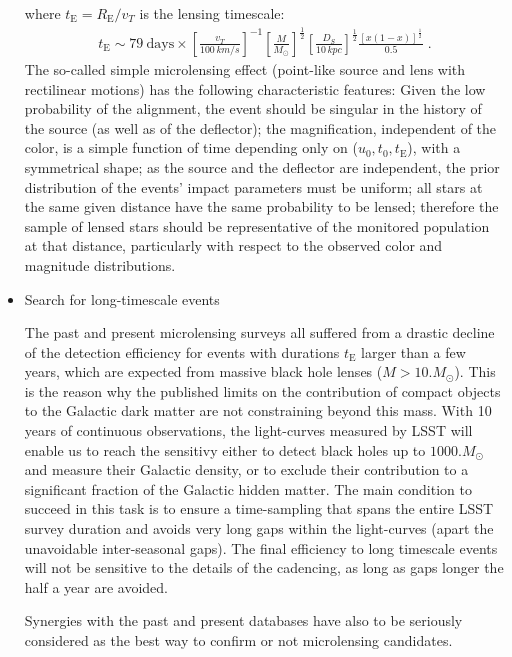 \begin{itemize}
where $t_{\mathrm{E}}=R_{\mathrm{E}} /v_T$ is the lensing timescale:
\begin{eqnarray}
t_{\mathrm{E}} \sim
79\ \mathrm{days} \times %
\left[\frac{v_T}{100\, km/s}\right]^{-1}
\left[\frac{M}{M_\odot}\right]^{\frac{1}{2}}
\left[\frac{D_S}{10\, kpc}\right]^{\frac{1}{2}}
\frac{[x(1-x)]^{\frac{1}{2}}}{0.5}\; . %
\end{eqnarray}
The so-called simple microlensing effect (point-like source and lens
with rectilinear motions) has the following characteristic
features: 
Given the low probability of the alignment,
the event should be singular in the history of the source
(as well as of the deflector);
the magnification, independent of the color,
is a simple function of time
depending only on ($u_0, t_0, t_{\mathrm{E}}$),
with a symmetrical shape;
as the source and the deflector are independent,
the prior distribution of the events' impact parameters must be uniform;
all stars at the same given distance have the same probability to be lensed;
therefore the sample of lensed stars should be representative
of the monitored population at that distance, particularly with respect to
the observed color and magnitude distributions.

    \item Search for long-timescale events
    
        The past and present microlensing surveys all suffered from a drastic decline of the
detection efficiency for events with durations $t_{\mathrm{E}}$ larger than a few years, which are expected from massive black hole lenses ($M>10.M_\odot$). This is the reason why the published limits on the contribution of compact objects to the Galactic dark matter are not constraining beyond this mass. With 10 years of continuous observations, the light-curves measured by LSST will enable us to reach the sensitivy either to detect black holes up to $1000.M_\odot$ and measure their Galactic density, or to exclude their contribution to a significant fraction of the Galactic hidden matter.
The main condition to succeed in this task is to ensure a time-sampling that spans the entire LSST survey duration and avoids very long gaps within the light-curves (apart the unavoidable inter-seasonal gaps). The final efficiency to long timescale events will not be sensitive to the details of the cadencing, as long as gaps longer the half a year are avoided.

Synergies with the past and present databases have also to be seriously considered as the best way to confirm or not microlensing candidates.


\end{itemize}
